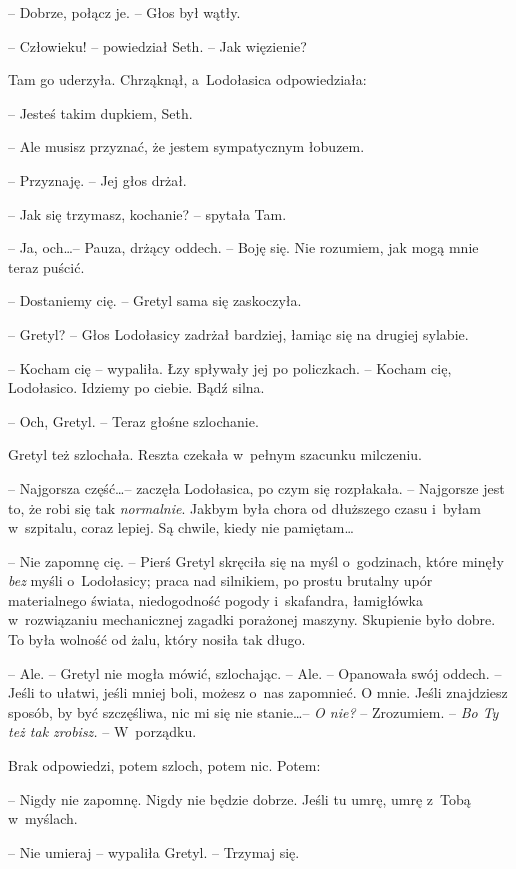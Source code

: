 \documentclass[oneside,polish,11pt,sfheadings]{mwbk}
\begin{document}
-- Dobrze, połącz je. -- Głos był wątły.

-- Człowieku! -- powiedział Seth. -- Jak więzienie?

Tam go uderzyła. Chrząknął, a~Lodołasica odpowiedziała: 

-- Jesteś takim
dupkiem, Seth.

-- Ale musisz przyznać, że jestem sympatycznym łobuzem.

-- Przyznaję. -- Jej głos drżał.

-- Jak się trzymasz, kochanie? -- spytała Tam.

-- Ja, och\ldots  -- Pauza, drżący oddech. -- Boję się. Nie rozumiem, jak mogą
mnie teraz puścić.

-- Dostaniemy cię. -- Gretyl sama się zaskoczyła.

-- Gretyl? -- Głos Lodołasicy zadrżał bardziej, łamiąc się na drugiej
sylabie.

-- Kocham cię -- wypaliła. Łzy spływały jej po policzkach. -- Kocham cię,
Lodołasico. Idziemy po ciebie. Bądź silna.

-- Och, Gretyl. -- Teraz głośne szlochanie.

Gretyl też szlochała. Reszta czekała w~pełnym szacunku milczeniu.

-- Najgorsza część\ldots  -- zaczęła Lodołasica, po czym się rozpłakała. -- Najgorsze jest to, że robi się tak \textit{normalnie}. Jakbym była chora
od dłuższego czasu i~byłam w~szpitalu, coraz lepiej. Są chwile, kiedy
nie pamiętam\ldots 

-- Nie zapomnę cię. -- Pierś Gretyl skręciła się na myśl o~godzinach,
które minęły \textit{bez }myśli o~Lodołasicy; praca nad silnikiem, po
prostu brutalny upór materialnego świata, niedogodność pogody i~skafandra, łamigłówka w~rozwiązaniu mechanicznej zagadki porażonej
maszyny. Skupienie było dobre. To była wolność od żalu, który nosiła tak
długo.

-- Ale. -- Gretyl nie mogła mówić, szlochając. -- Ale. -- Opanowała swój
oddech. -- Jeśli to ułatwi, jeśli mniej boli, możesz o~nas zapomnieć. O
mnie. Jeśli znajdziesz sposób, by być szczęśliwa, nic mi się nie
stanie\ldots  -- \textit{O nie? }-- Zrozumiem. -- \textit{Bo Ty też tak zrobisz.} -- W~porządku.

Brak odpowiedzi, potem szloch, potem nic. Potem: 

-- Nigdy nie zapomnę.
Nigdy nie będzie dobrze. Jeśli tu umrę, umrę z~Tobą w~myślach.

-- Nie umieraj -- wypaliła Gretyl. -- Trzymaj się.
\end{document}
